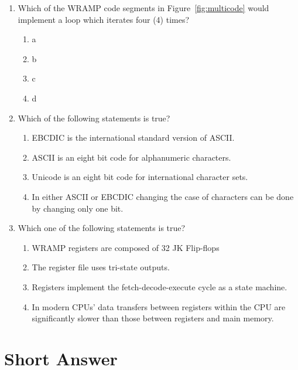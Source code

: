 \documentclass[a4paper,10pt]{article}
\begin{document}
\begin{enumerate}
\item 
\label{ques:multicodeend}
Which of the WRAMP code segments in Figure~\ref{fig:multicode} would
implement a loop which iterates four (4) times?
\begin{enumerate}
  \item a
  \item b
  \item c
  \item d
\end{enumerate}
\newpage

\item Which of the following statements is true?
\begin{enumerate}
  \item EBCDIC is the international standard version of ASCII.
  \item ASCII is an eight bit code for alphanumeric characters.
  \item Unicode is an eight bit code for international character sets.
  \item In either ASCII or EBCDIC changing the case of characters can be done by changing only one
  bit.
\end{enumerate}

\item Which one of the following statements is true?
\begin{enumerate}
  \item WRAMP registers are composed of 32 JK Flip-flops
  \item The register file uses tri-state outputs. 
  \item Registers implement the fetch-decode-execute cycle as a state machine.
  \item In modern CPUs' data transfers between registers within the
  CPU are significantly slower than those between registers and main
  memory. 
\end{enumerate}

\end{enumerate}

\section{Short Answer}
\end{document}
